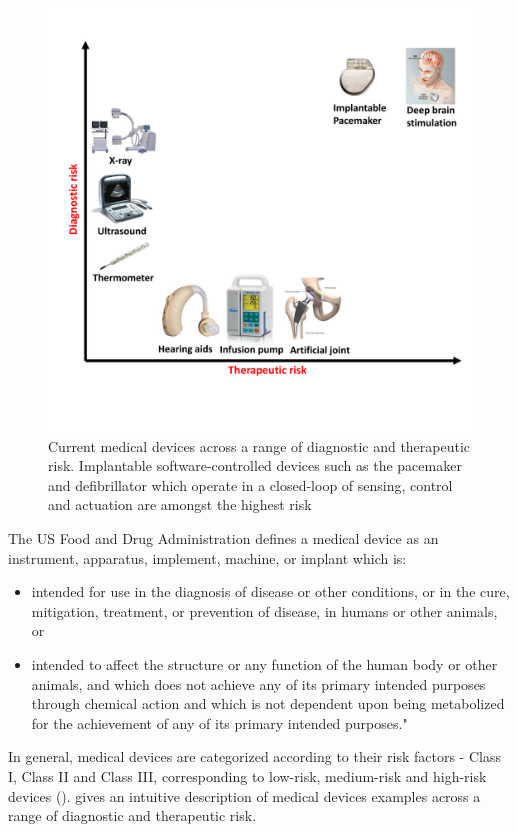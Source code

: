 \begin{figure}[t]
		\centering
		\includegraphics[width=\textwidth]{figs/devices_new.pdf}
		\caption{\small Current medical devices across a range of diagnostic and therapeutic risk. Implantable software-controlled devices such as the pacemaker and defibrillator which operate in a closed-loop of sensing, control and actuation are amongst the highest risk}
		\vspace{-10pt}
		\label{fig:Cur}
\end{figure}

The US Food and Drug Administration defines a medical device as an instrument, apparatus, implement, machine, or implant which is:
\begin{itemize}
	\item intended for use in the diagnosis of disease or other conditions, or in the cure, mitigation, treatment, or prevention of disease, in humans or other animals, or
	\item intended to affect the structure or any function of the human body or other animals, and which does not achieve any of its primary intended purposes through chemical action and which is not dependent upon being metabolized for the achievement of any of its primary intended purposes."
\end{itemize}
\newpage
In general, medical devices are categorized according to their risk factors - Class I, Class II and Class III, corresponding to low-risk, medium-risk and high-risk devices (\cite{class}).   gives an intuitive description of medical devices examples across a range of diagnostic and therapeutic risk.


